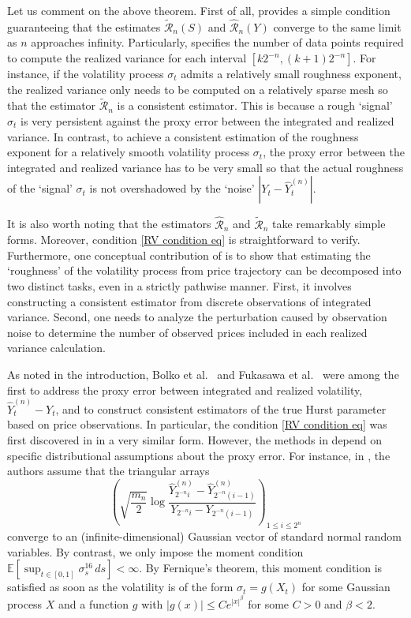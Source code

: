 \documentclass[12pt,reqno]{article}
\def\wh{\widehat}
\def\wt{\widetilde}
\numberwithin{equation}{section}
\def\cR{{\mathscr R}}
\theoremstyle{definition}
\def\wt#1{\widetilde{#1}}
\def\wh{\widehat}
\def\wt{\widetilde}
\newcommand{\bE}{\mathbb{E}}
\begin{document}
Let us comment on the above theorem. First of all,  provides a simple condition guaranteeing that the estimates $\wt \cR_n(S)$ and $\wh \cR_n(Y)$ converge to the same limit as $n$ approaches infinity. Particularly,  specifies the number of data points required to compute the realized variance for each interval $[k2^{-n},(k+1)2^{-n}]$. For instance, if the volatility process $\sigma_t$ admits a relatively small roughness exponent, the realized variance only needs to be computed on a relatively sparse mesh so that the estimator $\wt \cR_n$ is a consistent estimator. This is because a rough \lq signal' $\sigma_t$ is very persistent against  the proxy error between the integrated and realized variance. In contrast, to achieve a consistent estimation of the roughness exponent for a relatively smooth volatility process $\sigma_t$, the proxy error between the integrated and realized variance has to be very small so that the actual roughness of the \lq signal' $\sigma_t$ is not overshadowed by the \lq noise' $|Y_t - \wh Y^{(n)}_t|$. 

It is also worth noting that the estimators $\wh \cR_n$ and $\wt \cR_n$ take remarkably simple forms. Moreover, condition \eqref{RV condition eq} is straightforward to verify. Furthermore, one conceptual contribution of  is to show that estimating the \lq roughness' of the volatility process from price trajectory can be decomposed into two distinct tasks, even in a strictly pathwise manner. First, it involves constructing a consistent estimator from discrete observations of integrated variance. Second, one needs to analyze the perturbation caused by observation noise to determine the number of observed prices included in each realized variance calculation.  

As noted in the introduction, Bolko et al.~\cite{BolkoPakkanen2022GMM} and Fukasawa et al.~\cite{Fukasawa2022Estimation} were among the first to address the proxy error between integrated and realized volatility, $\wh Y^{(n)}_t - Y_t$, and to construct consistent estimators of the true Hurst parameter based on price observations. In particular, the condition \eqref{RV condition eq} was first discovered in \cite[Theorem 2.8]{Fukasawa2022Estimation} in a very similar form. However, the methods in \cite{Fukasawa2022Estimation} depend on specific distributional assumptions about the proxy error. For instance, in \cite[Theorem 2.1]{Fukasawa2022Estimation}, the authors assume that the triangular arrays
	\begin{equation*}
	\left(\sqrt{\frac{m_n}{2}}\log \frac{\wh Y^{(n)}_{2^{-n}i} - \wh Y^{(n)}_{2^{-n}(i-1)}  }{Y_{2^{-n}i} - Y_{2^{-n}(i-1)}}\right)_{1 \le i \le 2^n} 
	\end{equation*}
	converge to an (infinite-dimensional) Gaussian vector of standard normal random variables. By contrast, we only impose the moment condition $\bE\left[\sup_{t \in [0,1]}\sigma^{16}_s\,ds\right] < \infty$. By Fernique's theorem, this moment condition is satisfied as soon as the volatility is of the form $\sigma_t=g(X_t)$ for some Gaussian process $X$ and a function $g$ with $|g(x)|\le C e^{|x|^{\beta}}$ for some $C>0$ and $\beta<2$.
	
\end{document}
